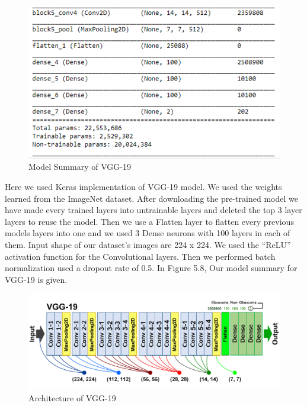 \vspace{5mm}
\begin{figure}[hbt!]
\centering
\includegraphics[scale=1]{images/fig-12.png}
\caption{Model Summary of VGG-19}
\label{fig:x Model Summary of VGG-19}
\end{figure}

\vspace{5mm}
\noindent Here we used Keras implementation of VGG-19 model. We used the weights learned from the ImageNet dataset. After downloading the pre-trained model we have made every trained layers into untrainable layers and deleted the top 3 layer layers to reuse the model. Then we use a Flatten layer to flatten every previous models layers into one and we used 3 Dense neurons with 100 layers in each of them. Input shape of our dataset's images are 224 x 224. We used the “ReLU” activation function for the Convolutional layers. Then we performed batch normalization used a dropout rate of 0.5. In Figure 5.8, Our model summary for VGG-19 is given.

\vspace{5mm}
\begin{figure}[hbt!]
\centering
\includegraphics[scale=0.75]{images/Architecture of VGG-19.png}
\caption{Architecture of VGG-19}
\label{fig:x Architecture of VGG-19}
\end{figure}

